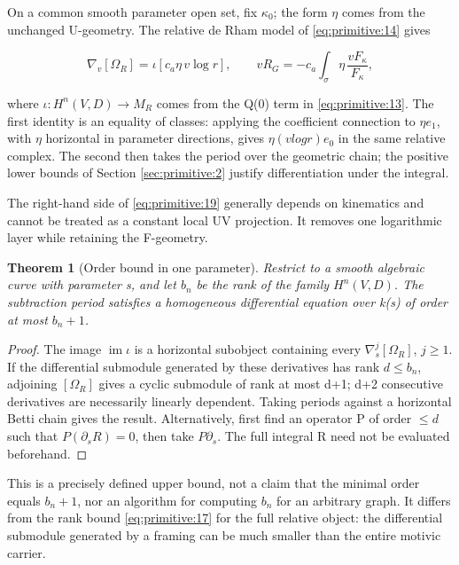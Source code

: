 \documentclass[11pt,a4paper,oneside]{article}
\theoremstyle{plain}
\newtheorem{theorem}{Theorem}[section]
\theoremstyle{definition}
\theoremstyle{remark}
\numberwithin{equation}{section}
\begin{document}
On a common smooth parameter open set, fix \(\kappa _0\); the form \(\eta \) comes from the unchanged U-geometry. The relative de Rham model of \eqref{eq:primitive:14} gives

\begin{equation}
\nabla_v[\Omega_R]=\iota\!\left[c_a\eta\,v\log r\right],\qquad
 vR_G=-c_a\int_\sigma\eta\,\frac{vF_\kappa}{F_\kappa},          \label{eq:primitive:19}
\end{equation}

where \(\iota:H^n(V,D)\to M_R\) comes from the Q(0) term in \eqref{eq:primitive:13}. The first identity is an equality of classes: applying the coefficient connection to \(\eta e_1\), with \(\eta \) horizontal in parameter directions, gives \(\eta (vlog r)e_0\) in the same relative complex. The second then takes the period over the geometric chain; the positive lower bounds of Section \ref{sec:primitive:2} justify differentiation under the integral.

The right-hand side of \eqref{eq:primitive:19} generally depends on kinematics and cannot be treated as a constant local UV projection. It removes one logarithmic layer while retaining the F-geometry.

\begin{theorem}[Order bound in one parameter]

\label{thm:primitive:7.1} Restrict to a smooth algebraic curve with parameter s, and let \(b_n\) be the rank of the family \(H^n(V,D)\). The subtraction period satisfies a homogeneous differential equation over k(s) of order at most \(b_n+1\).

\end{theorem}

\begin{proof}

The image \(\operatorname{im}\iota\) is a horizontal subobject containing every \(\nabla _s^j[\Omega _R]\), \(j\ge 1\). If the differential submodule generated by these derivatives has rank \(d\le b_n\), adjoining \([\Omega _R]\) gives a cyclic submodule of rank at most d+1; d+2 consecutive derivatives are necessarily linearly dependent. Taking periods against a horizontal Betti chain gives the result. Alternatively, first find an operator P of order \(\le d\) such that \(P(\partial_s R)=0\), then take \(P\partial _s\). The full integral R need not be evaluated beforehand.

\end{proof}

This is a precisely defined upper bound, not a claim that the minimal order equals \(b_n+1\), nor an algorithm for computing \(b_n\) for an arbitrary graph. It differs from the rank bound \eqref{eq:primitive:17} for the full relative object: the differential submodule generated by a framing can be much smaller than the entire motivic carrier.
\end{document}
